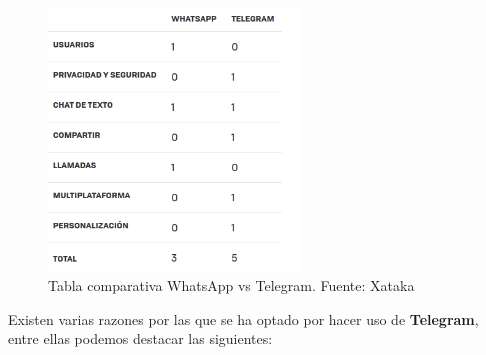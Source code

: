 \begin{figure}[H]
	\centering
	\includegraphics[width=0.6\textwidth]{img/tabla-comparativa}
	\caption{Tabla comparativa WhatsApp vs Telegram. Fuente: Xataka \cite{articulo-xataka}}
	\label{fig:tabla-comparativa}
\end{figure}

Existen varias razones por las que se ha optado por hacer uso de \textbf{Telegram}, entre ellas podemos destacar las siguientes:


